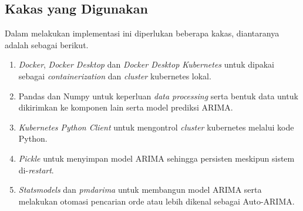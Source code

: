 \subsection{Kakas yang Digunakan}
Dalam melakukan implementasi ini diperlukan beberapa kakas, diantaranya adalah sebagai berikut.
\begin{enumerate}
  \item \textit{Docker}, \textit{Docker Desktop} dan \textit{Docker Desktop Kubernetes} untuk dipakai sebagai \textit{containerization} dan \textit{cluster} kubernetes lokal.
  \item Pandas dan Numpy untuk keperluan \textit{data processing} serta bentuk data untuk dikirimkan ke komponen lain serta model prediksi ARIMA.
  \item \textit{Kubernetes Python Client} untuk mengontrol \textit{cluster} kubernetes melalui kode Python.
  \item \textit{Pickle} untuk menyimpan model ARIMA sehingga persisten meskipun sistem di-\textit{restart}.
  \item \textit{Statsmodels} dan \textit{pmdarima} untuk membangun model ARIMA serta melakukan otomasi pencarian orde atau lebih dikenal sebagai Auto-ARIMA.
\end{enumerate}